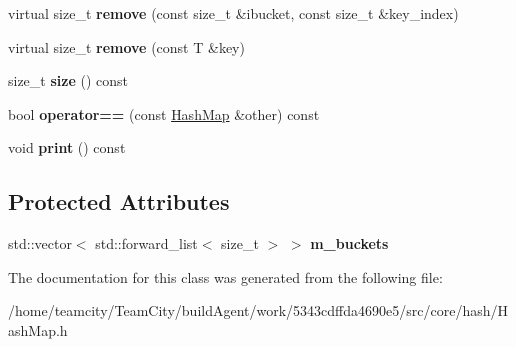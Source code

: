 \begin{DoxyCompactItemize}
\item 
virtual size\+\_\+t {\bfseries remove} (const size\+\_\+t \&ibucket, const size\+\_\+t \&key\+\_\+index)\hypertarget{classHashMap_aeb1bfd294550522d4b99cb1fc5855981}{}\label{classHashMap_aeb1bfd294550522d4b99cb1fc5855981}

\item 
virtual size\+\_\+t {\bfseries remove} (const T \&key)\hypertarget{classHashMap_a37060379e724337f2b42cf185f34fdc9}{}\label{classHashMap_a37060379e724337f2b42cf185f34fdc9}

\item 
size\+\_\+t {\bfseries size} () const \hypertarget{classHashMap_a0649c3b72405bfef706d98e281df4bf7}{}\label{classHashMap_a0649c3b72405bfef706d98e281df4bf7}

\item 
bool {\bfseries operator==} (const \hyperlink{classHashMap}{Hash\+Map} \&other) const \hypertarget{classHashMap_a7601c385de515579179c5ad40b2f5865}{}\label{classHashMap_a7601c385de515579179c5ad40b2f5865}

\item 
void {\bfseries print} () const \hypertarget{classHashMap_a805dc87c2829ce7b657ced9f0fa0f958}{}\label{classHashMap_a805dc87c2829ce7b657ced9f0fa0f958}

\end{DoxyCompactItemize}
\subsection*{Protected Attributes}
\begin{DoxyCompactItemize}
\item 
std\+::vector$<$ std\+::forward\+\_\+list$<$ size\+\_\+t $>$ $>$ {\bfseries m\+\_\+buckets}\hypertarget{classHashMap_a962a721172bfc7ec504c756e906b3af4}{}\label{classHashMap_a962a721172bfc7ec504c756e906b3af4}

\end{DoxyCompactItemize}


The documentation for this class was generated from the following file\+:\begin{DoxyCompactItemize}
\item 
/home/teamcity/\+Team\+City/build\+Agent/work/5343cdffda4690e5/src/core/hash/Hash\+Map.\+h\end{DoxyCompactItemize}
